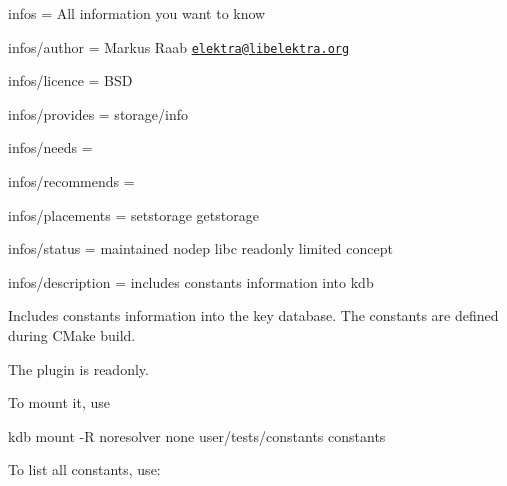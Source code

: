 
\begin{DoxyItemize}
\item infos = All information you want to know
\item infos/author = Markus Raab \href{mailto:elektra@libelektra.org}{\tt elektra@libelektra.\+org}
\item infos/licence = B\+SD
\item infos/provides = storage/info
\item infos/needs =
\item infos/recommends =
\item infos/placements = setstorage getstorage
\item infos/status = maintained nodep libc readonly limited concept
\item infos/description = includes constants information into kdb
\end{DoxyItemize}

Includes constants information into the key database. The constants are defined during C\+Make build.

The plugin is readonly.

To mount it, use


\begin{DoxyCode}
kdb mount -R noresolver none user/tests/constants constants
\end{DoxyCode}


To list all constants, use\+:


